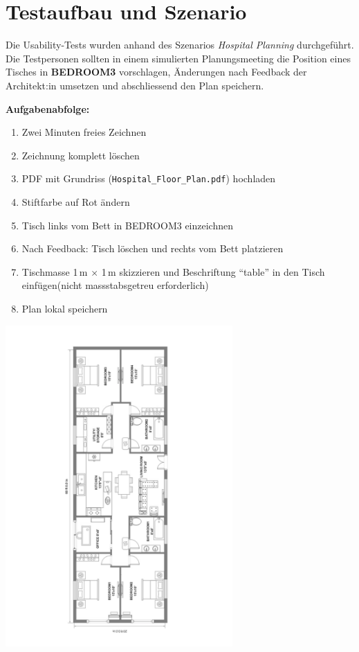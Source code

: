 \section{Testaufbau und Szenario}
Die Usability-Tests wurden anhand des Szenarios \emph{Hospital Planning} durchgeführt. 
Die Testpersonen sollten in einem simulierten Planungsmeeting die Position eines Tisches in \textbf{BEDROOM3} vorschlagen, Änderungen nach Feedback der Architekt:in umsetzen und abschliessend den Plan speichern.

\textbf{Aufgabenabfolge:}
\begin{enumerate}
    \item Zwei Minuten freies Zeichnen
    \item Zeichnung komplett löschen
    \item PDF mit Grundriss (\texttt{Hospital\_Floor\_Plan.pdf}) hochladen
    \item Stiftfarbe auf Rot ändern
    \item Tisch links vom Bett in BEDROOM3 einzeichnen
    \item Nach Feedback: Tisch löschen und rechts vom Bett platzieren
    \item Tischmasse 1\,m $\times$ 1\,m skizzieren und Beschriftung \enquote{table} in den Tisch einfügen(nicht massstabsgetreu erforderlich)
    \item Plan lokal speichern
\end{enumerate}

\begin{center}
    \includegraphics[width=0.65\textwidth]{graphics/Hospital_Floor_Plan.pdf}
\end{center}
\clearpage


